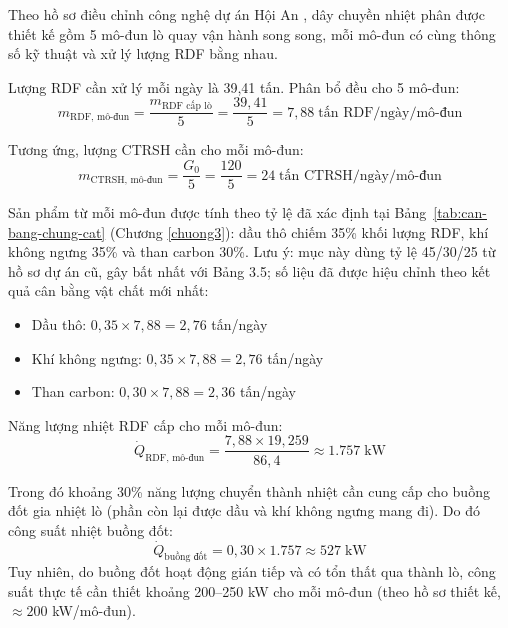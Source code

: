 \documentclass[../main.tex]{subfiles}
\begin{document}
Theo hồ sơ điều chỉnh công nghệ dự án Hội An \cite{ThuyetMinhDieuChinh2026}, dây chuyền nhiệt phân được thiết kế gồm 5 mô-đun lò quay vận hành song song, mỗi mô-đun có cùng thông số kỹ thuật và xử lý lượng RDF bằng nhau.

Lượng RDF cần xử lý mỗi ngày là 39,41 tấn. Phân bổ đều cho 5 mô-đun:
\begin{equation}
  m_{\text{RDF, mô-đun}} = \frac{m_{\text{RDF cấp lò}}}{5} = \frac{39{,}41}{5} = 7{,}88 \;\text{tấn RDF/ngày/mô-đun}
\end{equation}

Tương ứng, lượng CTRSH cần cho mỗi mô-đun:
\begin{equation}
  m_{\text{CTRSH, mô-đun}} = \frac{G_0}{5} = \frac{120}{5} = 24 \;\text{tấn CTRSH/ngày/mô-đun}
\end{equation}

Sản phẩm từ mỗi mô-đun được tính theo tỷ lệ đã xác định tại Bảng~\ref{tab:can-bang-chung-cat} (Chương \ref{chuong3}): dầu thô chiếm 35\% khối lượng RDF, khí không ngưng 35\% và than carbon 30\%. Lưu ý: mục này dùng tỷ lệ 45/30/25 từ hồ sơ dự án cũ, gây bất nhất với Bảng 3.5; số liệu đã được hiệu chỉnh theo kết quả cân bằng vật chất mới nhất:
\begin{itemize}
  \item Dầu thô: $0{,}35 \times 7{,}88 = 2{,}76$ tấn/ngày
  \item Khí không ngưng: $0{,}35 \times 7{,}88 = 2{,}76$ tấn/ngày
  \item Than carbon: $0{,}30 \times 7{,}88 = 2{,}36$ tấn/ngày
\end{itemize}

Năng lượng nhiệt RDF cấp cho mỗi mô-đun:
\begin{equation}
  \dot{Q}_{\text{RDF, mô-đun}} = \frac{7{,}88 \times 19{,}259}{86{,}4} \approx 1.757 \;\text{kW}
\end{equation}

Trong đó khoảng 30\% năng lượng chuyển thành nhiệt cần cung cấp cho buồng đốt gia nhiệt lò (phần còn lại được dầu và khí không ngưng mang đi). Do đó công suất nhiệt buồng đốt:
\begin{equation}
  \dot{Q}_{\text{buồng đốt}} = 0{,}30 \times 1.757 \approx 527 \;\text{kW}
\end{equation}
Tuy nhiên, do buồng đốt hoạt động gián tiếp và có tổn thất qua thành lò, công suất thực tế cần thiết khoảng 200--250 kW cho mỗi mô-đun (theo hồ sơ thiết kế, $\approx 200$ kW/mô-đun).
\end{document}
